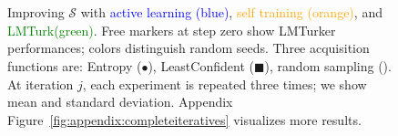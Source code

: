 \documentclass[11pt]{article}
\def\md{LMTurk\xspace}
\def\mdr{LMTurker\xspace}
\def\figref#1{Figure~\ref{fig:#1}}
\def\figlabel#1{\label{fig:#1}\label{p:#1}}
\begin{document}
\begin{figure}[h!]
{}
\hspace{-.2cm}\vspace{-.25cm}
\\
\hspace{-.2cm}\vspace{-.25cm}
\hspace{-.2cm}\vspace{-.25cm}
\\
\hspace{-.2cm}\vspace{-.2cm}
\hspace{-.2cm}\vspace{-.2cm}
\caption{
  Improving $\mathcal{S}$ with
  \textcolor{blue}{active learning (blue)},
  \textcolor{orange}{self training (orange)},
  and
  \textcolor{green}{\md (green)}.
  Free markers at step zero show \mdr performances;
  colors distinguish random seeds.
  Three acquisition functions are:
  Entropy ($\bullet$),
  LeastConfident (\tiny$\blacksquare$\normalsize),
  random sampling (\tiny\XSolidBold\normalsize).
  At iteration $j$, each experiment is repeated
  three times; we show
  mean and standard deviation.
  Appendix \figref{appendix:completeiteratives}
  visualizes more results.
}
\figlabel{iterative}
\end{figure}
\end{document}
